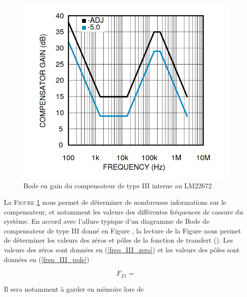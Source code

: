 \documentclass[a4paper,12pt]{book}
\begin{document}
					\begin{figure}[h]
						\begin{center}
							\includegraphics[scale=0.4]{../Illus/comp_gain.png}
						\end{center}
						\vspace{-2em}
						\caption{Bode en gain du compensateur de type III interne au LM22672 \cite{LM22672}}
						\label{comp_gain}
					\end{figure}
					
					La \textsc{Figure \ref{comp_gain}} nous permet de déterminer de nombreuses informations sur le compensateur, et notamment les valeurs des différentes fréquences de cassure du système. En accord avec l'allure typique d'un diagramme de Bode de compensateur de type III donné en Figure , la lecture de la Figure nous permet de déterminer les valeurs des zéros et pôles de la fonction de transfert (). Les valeurs des zéros sont données en (\ref{freq_III_zero}) et les valeurs des pôles sont données en (\ref{freq_III_pole})
					
					\begin{equation}
						F_{Z1} = 
						\label{freq_III_zero}
					\end{equation}
					
					
					
					Il sera notamment à garder en mémoire lors de 
					
\end{document}
